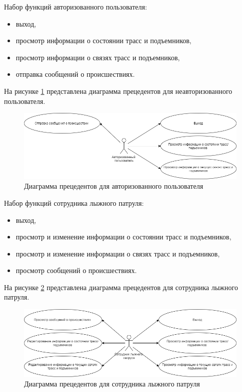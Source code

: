 	
	
	
	
Набор функций авторизованного пользователя:
	\begin{itemize}
		\item выход,
		\item просмотр информации о состоянии трасс и подъемников,
		\item просмотр информации о связях трасс и подъемников,
		\item отправка сообщений о происшествиях.
	\end{itemize}

\clearpage
На рисунке \ref{img:use_case2} представлена диаграмма прецедентов  для неавторизованного пользователя.

\begin{figure}[h!]
	\begin{center}
		\includegraphics[scale=0.55]{../imgs/use_case/use-case2.png}
	\end{center}
	\captionsetup{justification=centering}
	\caption{Диаграмма прецедентов для авторизованного пользователя\\}
	\label{img:use_case2}
\end{figure}

	
Набор функций сотрудника лыжного патруля:
	\begin{itemize}
		\item выход,
		\item просмотр и изменение информации о состоянии трасс и подъемников,
		\item просмотр и изменение информации о связях трасс и подъемников,
		\item просмотр сообщений о происшествиях.
	\end{itemize}

На рисунке \ref{img:use_case3} представлена диаграмма прецедентов  для сотрудника лыжного патруля.

\begin{figure}[h!]
	\begin{center}
		\includegraphics[scale=0.6]{../imgs/use_case/use-case3.png}
	\end{center}
	\captionsetup{justification=centering}
	\caption{Диаграмма прецедентов для сотрудника лыжного патруля}
	\label{img:use_case3}
\end{figure}
	
